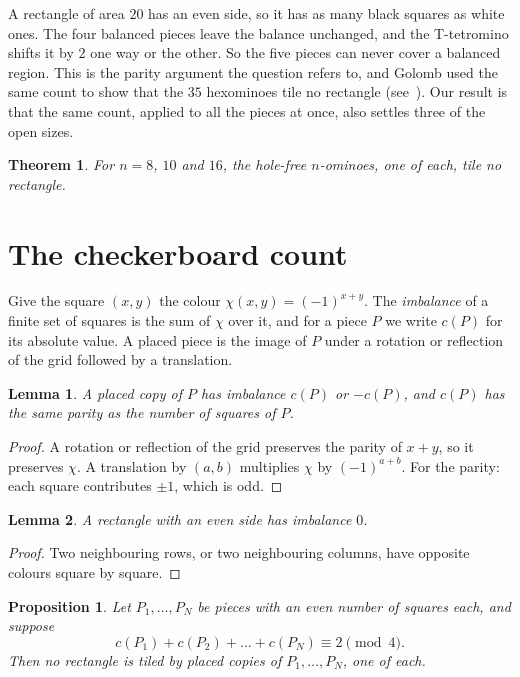 \documentclass[11pt]{article}
\newtheorem{theorem}{Theorem}
\newtheorem{proposition}{Proposition}
\newtheorem{lemma}{Lemma}
\begin{document}
A rectangle of area $20$ has an even side, so it has as many black squares as white ones. The four balanced pieces
leave the balance unchanged, and the T-tetromino shifts it by $2$ one way or the other. So the five pieces can never
cover a balanced region. This is the parity argument the question refers to, and Golomb used the same count to show
that the $35$ hexominoes tile no rectangle (see~\cite[Example~3]{GB22}). Our result is that the same count, applied
to all the pieces at once, also settles three of the open sizes.

\begin{theorem}\label{thm:main}
For $n=8$, $10$ and $16$, the hole-free $n$-ominoes, one of each, tile no rectangle.
\end{theorem}

\section{The checkerboard count}

Give the square $(x,y)$ the colour $\chi(x,y)=(-1)^{x+y}$. The \emph{imbalance} of a finite set of squares is the sum
of $\chi$ over it, and for a piece $P$ we write $c(P)$ for its absolute value. A placed piece is the image of $P$ under
a rotation or reflection of the grid followed by a translation.

\begin{lemma}\label{lem:place}
A placed copy of $P$ has imbalance $c(P)$ or $-c(P)$, and $c(P)$ has the same parity as the number of squares of
$P$.
\end{lemma}

\begin{proof}
A rotation or reflection of the grid preserves the parity of $x+y$, so it preserves $\chi$. A translation by $(a,b)$
multiplies $\chi$ by $(-1)^{a+b}$. For the parity: each square contributes $\pm1$, which is odd.
\end{proof}

\begin{lemma}\label{lem:rect}
A rectangle with an even side has imbalance $0$.
\end{lemma}

\begin{proof}
Two neighbouring rows, or two neighbouring columns, have opposite colours square by square.
\end{proof}

\begin{proposition}\label{prop:mod4}
Let $P_1,\dots,P_N$ be pieces with an even number of squares each, and suppose
\[
c(P_1)+c(P_2)+\dots+c(P_N)\equiv 2\pmod 4 .
\]
Then no rectangle is tiled by placed copies of $P_1,\dots,P_N$, one of each.
\end{proposition}
\end{document}
